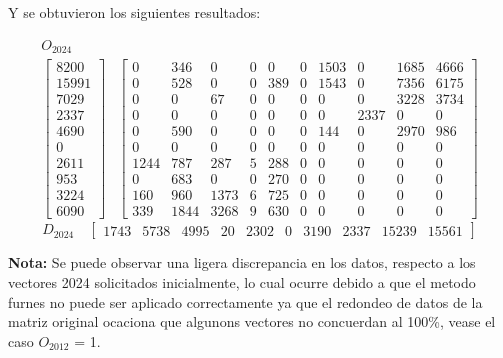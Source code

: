 \documentclass[12pt]{article} %
\begin{document}
Y se obtuvieron los siguientes resultados:

{\footnotesize
  \[
  \begin{array}{cc}
  \text{$O_{2024}$} & \\
  \left[ \begin{array}{c}
    8200 \\
    15991 \\
    7029 \\
    2337 \\
    4690 \\
    0 \\
    2611 \\
    953 \\
    3224 \\
    6090
  \end{array} \right] &
  \left[ \begin{array}{cccccccccc}
    0 & 346 & 0 & 0 & 0 & 0 & 1503 & 0 & 1685 & 4666 \\
    0 & 528 & 0 & 0 & 389 & 0 & 1543 & 0 & 7356 & 6175 \\
    0 & 0 & 67 & 0 & 0 & 0 & 0 & 0 & 3228 & 3734 \\
    0 & 0 & 0 & 0 & 0 & 0 & 0 & 2337 & 0 & 0 \\
    0 & 590 & 0 & 0 & 0 & 0 & 144 & 0 & 2970 & 986 \\
    0 & 0 & 0 & 0 & 0 & 0 & 0 & 0 & 0 & 0 \\
    1244 & 787 & 287 & 5 & 288 & 0 & 0 & 0 & 0 & 0 \\
    0 & 683 & 0 & 0 & 270 & 0 & 0 & 0 & 0 & 0 \\
    160 & 960 & 1373 & 6 & 725 & 0 & 0 & 0 & 0 & 0 \\
    339 & 1844 & 3268 & 9 & 630 & 0 & 0 & 0 & 0 & 0
  \end{array} \right]
  \end{array}
  \]
  \[
  \text{$D_{ 2024}$} \quad \left[ \begin{array}{cccccccccc}
    1743 & 5738 & 4995 & 20 & 2302 & 0 & 3190 & 2337 & 15239 & 15561
  \end{array} \right]
  \]
}

\textbf{Nota:} Se puede observar una ligera discrepancia en los datos, respecto a los vectores 2024 solicitados inicialmente, lo cual ocurre debido a que el metodo furnes no puede ser aplicado correctamente ya que el redondeo de datos de la matriz original ocaciona que algunons vectores no concuerdan al 100\%, vease el caso $O_{2012}$ = 1.


\end{document}
